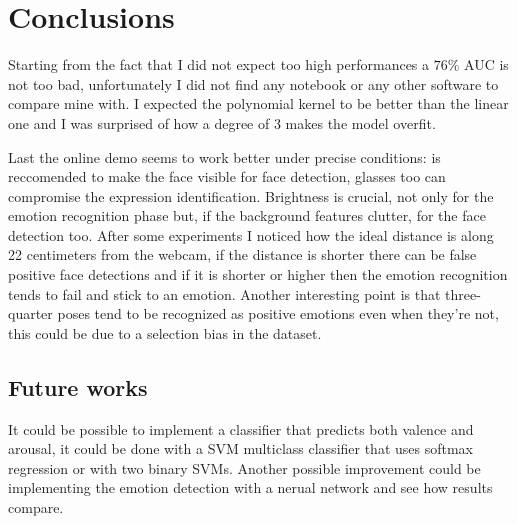 \section{Conclusions}
Starting from the fact that I did not expect too high performances a $76\%$ AUC is not too bad, unfortunately I did not find any notebook or any other software to compare mine with.
I expected the polynomial kernel to be better than the linear one and I was surprised of how a degree of 3 makes the model overfit.

Last the online demo seems to work better under precise conditions: is reccomended to make the face visible for face detection, glasses too can compromise the expression identification. 
Brightness is crucial, not only for the emotion recognition phase but, if the background features clutter, for the face detection too.
After some experiments I noticed how the ideal distance is along 22 centimeters from the webcam, if the distance is shorter there can be false positive face detections and if it is shorter or higher then the emotion recognition tends to fail and stick to an emotion.
Another interesting point is that three-quarter poses tend to be recognized as positive emotions even when they're not, this could be due to a selection bias in the dataset.

\subsection{Future works}
It could be possible to implement a classifier that predicts both valence and arousal, it could be done with a SVM multiclass classifier that uses softmax regression or with two binary SVMs.
Another possible improvement could be implementing the emotion detection with a nerual network and see how results compare.
